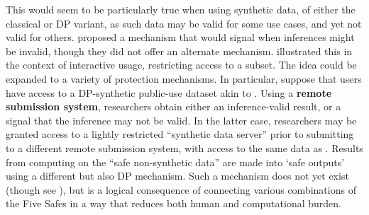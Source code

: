 This would seem to be particularly true when using synthetic data, of either the classical or DP variant, as such data may be valid for some use cases, and yet not valid for others. \cite{barrientos_providing_2018}  proposed a mechanism that would signal when inferences might be invalid, though they did not offer an alternate mechanism. \cite{dwork_fienberg_2018} illustrated this in the context of interactive usage, restricting access to a subset. The idea could be expanded to a variety of protection mechanisms. In particular, suppose that users have access to a DP-synthetic public-use dataset akin to \cite{barrientos_providing_2018}. Using a \textbf{remote submission system}, researchers obtain either an inference-valid result, or a signal that the inference may not be valid. In the latter case,  researchers may be granted access to a lightly restricted ``synthetic data server'' \cite{vilhuber_usage_2016} prior to submitting to a  different remote submission system, with access to the same data as \cite{dwork_fienberg_2018}. Results from computing on the ``safe non-synthetic data'' are made into `safe outputs' using a different but also DP mechanism. Such a mechanism does not yet exist (though see \cite{vilhuber_usage_2016}), but is a logical consequence of connecting various combinations of the Five Safes in a way that reduces both human and computational burden.




%




